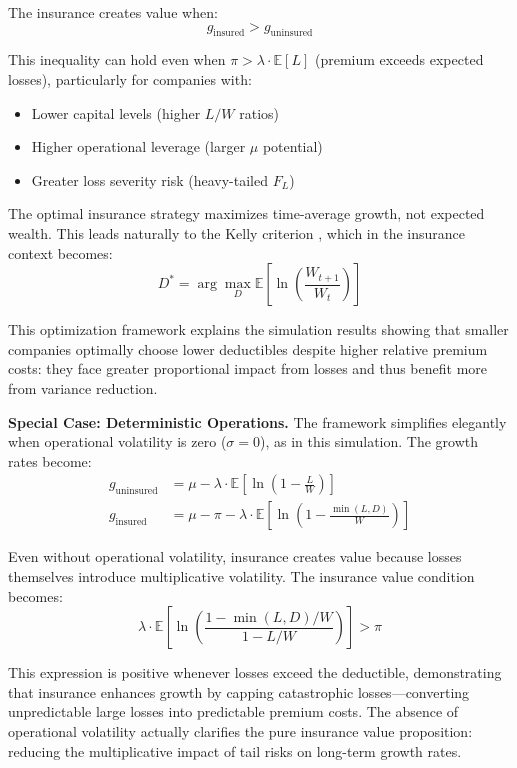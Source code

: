 \documentclass[11pt,letterpaper]{article}
\newcommand{\E}{\mathbb{E}}
\begin{document}
The insurance creates value when:
\begin{equation}
g_{\text{insured}} > g_{\text{uninsured}}
\end{equation}

This inequality can hold even when $\pi > \lambda \cdot \E[L]$ (premium exceeds expected losses), particularly for companies with:
\begin{itemize}
    \item Lower capital levels (higher $L/W$ ratios)
    \item Higher operational leverage (larger $\mu$ potential)
    \item Greater loss severity risk (heavy-tailed $F_L$)
\end{itemize}

The optimal insurance strategy maximizes time-average growth, not expected wealth. This leads naturally to the Kelly criterion \citep{kelly1956new}, which in the insurance context becomes:
\begin{equation}
D^* = \arg\max_D \E\left[\ln\left(\frac{W_{t+1}}{W_t}\right)\right]
\end{equation}

This optimization framework explains the simulation results showing that smaller companies optimally choose lower deductibles despite higher relative premium costs: they face greater proportional impact from losses and thus benefit more from variance reduction.

\textbf{Special Case: Deterministic Operations.} The framework simplifies elegantly when operational volatility is zero ($\sigma = 0$), as in this simulation. The growth rates become:
\begin{align}
g_{\text{uninsured}} &= \mu - \lambda \cdot \E\left[\ln\left(1 - \frac{L}{W}\right)\right] \\
g_{\text{insured}} &= \mu - \pi - \lambda \cdot \E\left[\ln\left(1 - \frac{\min(L,D)}{W}\right)\right]
\end{align}

Even without operational volatility, insurance creates value because losses themselves introduce multiplicative volatility. The insurance value condition becomes:
\begin{equation}
\lambda \cdot \E\left[\ln\left(\frac{1 - \min(L,D)/W}{1 - L/W}\right)\right] > \pi
\end{equation}

This expression is positive whenever losses exceed the deductible, demonstrating that insurance enhances growth by capping catastrophic losses—converting unpredictable large losses into predictable premium costs. The absence of operational volatility actually clarifies the pure insurance value proposition: reducing the multiplicative impact of tail risks on long-term growth rates.
\end{document}
